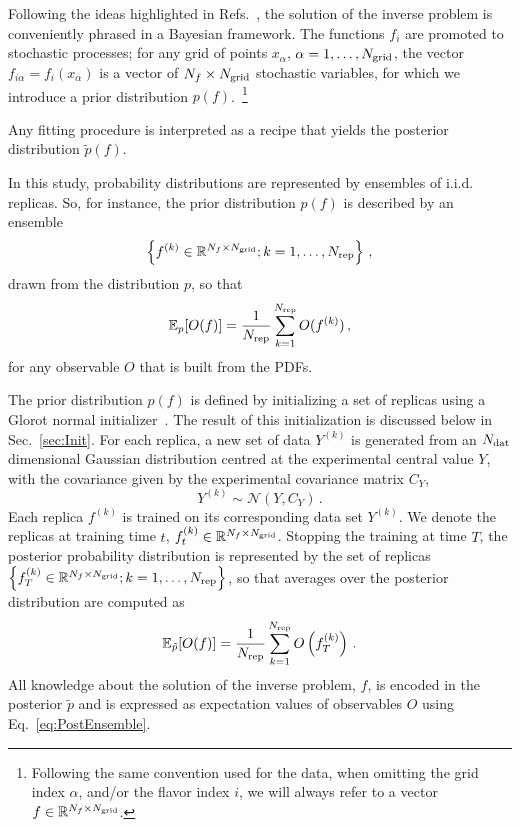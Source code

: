 Following the ideas highlighted in
Refs.~\cite{DelDebbio:2021whr,Candido:2024hjt}, the solution of the inverse
problem is conveniently phrased in a Bayesian framework. The functions $f_i$ are
promoted to stochastic processes; for any grid of points $x_{\alpha}$,
$\alpha=1, \ldots, N_{\mathrm{grid}}$, the vector $f_{i\alpha}=f_{i}(x_{\alpha})$ is a
vector of $N_{f}\times N_{\mathrm{grid}}$ stochastic variables, for which we introduce a
prior distribution $p(f)$.~\footnote{Following the same convention used for the
data, when omitting the grid index $\alpha$, and/or the flavor index $i$, we
will always refer to a vector $f \in \mathbb{R}^{N_{f}\times N_{\mathrm{grid}}}$.}

Any fitting procedure is interpreted as a recipe that yields the posterior
distribution $\tilde{p}(f)$.

In this study, probability distributions are represented by ensembles of i.i.d.
replicas. So, for instance, the prior distribution $p(f)$ is described by an
ensemble
\begin{equation}
    \label{eq:RepDef}
    \left\{f^{(k)} \in \mathbb{R}^{N_{f}\times N_{\mathrm{grid}}}; k=1, \ldots, N_{\rm rep}\right\}\, ,
\end{equation}
drawn from the distribution $p$, so that
\begin{equation}
    \label{eq:ReplicaEnsemble}
    \mathbb{E}_{p}[O(f)] = \frac{1}{N_{\rm rep}} \sum_{k=1}^{N_{\rm rep}} O(f^{(k)})\, ,
\end{equation}
for any observable $O$ that is built from the PDFs.

The prior distribution $p(f)$ is defined by initializing a set of replicas using
a Glorot normal initializer~\cite{glorot2010understanding}. The result of this
initialization is discussed below in Sec.~\ref{sec:Init}. For each replica, a
new set of data $Y^{(k)}$ is generated from an $N_{\mathrm{dat}}$ dimensional Gaussian
distribution centred at the experimental central value $Y$, with the covariance
given by the experimental covariance matrix $C_Y$,
\begin{equation}
    \label{eq:ExpReplicaDistr}
    Y^{(k)} \sim \mathcal{N}\left(Y, C_Y\right)\, .
\end{equation}
Each replica $f^{(k)}$ is trained on its corresponding data set $Y^{(k)}$. We
denote the replicas at training time $t$, $f^{(k)}_{t} \in
\mathbb{R}^{N_{f}\times N_{\mathrm{grid}}}$. Stopping the training at time $T$, the
posterior probability distribution is represented by the set of replicas
$\left\{f^{(k)}_{T}\in \mathbb{R}^{N_{f}\times N_{\mathrm{grid}}}; k=1, \ldots,
N_{\rm rep}\right\}$, so that averages over the posterior distribution are computed
as
\begin{equation}
    \label{eq:PostEnsemble}
    \mathbb{E}_{\tilde{p}}[O(f)] = \frac{1}{N_{\rm rep}} \sum_{k=1}^{N_{\rm rep}}
        O\left(f^{(k)}_{T}\right)\, .
\end{equation}
All knowledge about the solution of the inverse problem, $f$, is encoded in the
posterior $\tilde{p}$ and is expressed as expectation values of observables $O$
using Eq.~\eqref{eq:PostEnsemble}.

